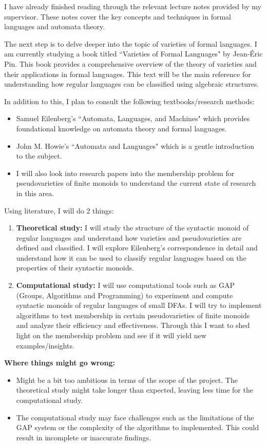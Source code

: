 I have already finished reading through the relevant lecture notes provided by my supervisor. These notes cover the key concepts and techniques in formal languages and automata theory.

The next step is to delve deeper into the topic of varieties of formal languages. I am currently studying a book titled ``Varieties of Formal Languages" by Jean-Éric Pin. This book provides a comprehensive overview of the theory of varieties and their applications in formal languages.
This text will be the main reference for understanding how regular languages can be classified using algebraic structures.

In addition to this, I plan to consult the following textbooks/research methods:
\begin{itemize}
    \item Samuel Eilenberg's ``Automata, Languages, and Machines" which provides foundational knowledge on automata theory and formal languages.
    \item John M. Howie's ``Automata and Languages" which is a gentle introduction to the subject.
    \item I will also look into research papers into the membership problem for pseudovarieties of finite monoids to understand the current state of research in this area.
\end{itemize}

Using literature, I will do 2 things:

\begin{enumerate}
    \item {\bf Theoretical study:} I will study the structure of the syntactic monoid of regular languages and understand how varieties and pseudovarieties are defined and classified. I will explore Eilenberg's correspondence in detail and understand how it can be used to classify regular languages based on the properties of their syntactic monoids.
    \item {\bf Computational study:} I will use computational tools such as GAP (Groups, Algorithms and Programming) to experiment and compute syntactic monoids of regular languages of small DFAs. I will try to implement algorithms to test membership in certain pseudovarieties of finite monoids and analyze their efficiency and effectiveness. Through this I want to shed light on the membership problem and see if it will yield new examples/insights.
\end{enumerate}

{\bf Where things might go wrong:}
\begin{itemize}
    \item Might be a bit too ambitious in terms of the scope of the project. The theoretical study might take longer than expected, leaving less time for the computational study.
    \item The computational study may face challenges such as the limitations of the GAP system or the complexity of the algorithms to implemented. This could result in incomplete or inaccurate findings.
\end{itemize}